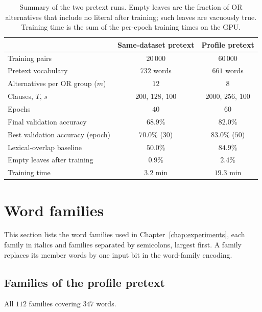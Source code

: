 \begin{table}[H]
\centering
\small
\caption{Summary of the two pretext runs. Empty leaves are the fraction of OR alternatives that
include no literal after training; such leaves are vacuously true. Training time is the sum of
the per-epoch training times on the GPU.}
\label{tab:app-pretext-summary}
\begin{tabular}{lcc}
\toprule
 & Same-dataset pretext & Profile pretext \\
\midrule
Training pairs & $20\,000$ & $60\,000$ \\
Pretext vocabulary & $732$ words & $661$ words \\
Alternatives per OR group ($m$) & $12$ & $8$ \\
Clauses, $T$, $s$ & $200$, $128$, $100$ & $2000$, $256$, $100$ \\
Epochs & $40$ & $60$ \\
Final validation accuracy & $68.9$\% & $82.0$\% \\
Best validation accuracy (epoch) & $70.0$\% ($30$) & $83.0$\% ($50$) \\
Lexical-overlap baseline & $50.0$\% & $84.9$\% \\
Empty leaves after training & $0.9$\% & $2.4$\% \\
Training time & $3.2$ min & $19.3$ min \\
\bottomrule
\end{tabular}
\end{table}

\section{Word families}
\label{app:families}

This section lists the word families used in Chapter~\ref{chap:experiments}, each family in
italics and families separated by semicolons, largest first. A family replaces its member words by
one input bit in the word-family encoding.

\subsection{Families of the profile pretext}

All $112$ families covering $347$ words.

